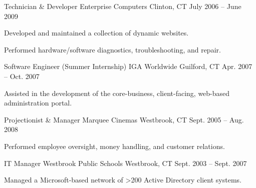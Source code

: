\begin{listSection}
    \listEntry
        {Technician \& Developer}
        {Enterprise Computers}
        {Clinton, CT}
        {July 2006 -- June 2009}
        {
            \begin{listGroupSection}
                \item {Developed and maintained a collection of dynamic websites.}
                \item {Performed hardware/software diagnostics, troubleshooting, and repair.}
            \end{listGroupSection}
        }

    \listEntry
        {Software Engineer (Summer Internship)}
        {IGA Worldwide}
        {Guilford, CT}
        {Apr. 2007 -- Oct. 2007}
        {
            \begin{listGroupSection}
                \item {Assisted in the development of the core-business, client-facing, web-based administration portal.}
            \end{listGroupSection}
        }

    \listEntry
        {Projectionist \& Manager}
        {Marquee Cinemas}
        {Westbrook, CT}
        {Sept. 2005 -- Aug. 2008}
        {
            \begin{listGroupSection}
                \item {Performed employee oversight, money handling, and customer relations.}
            \end{listGroupSection}
        }

    \listEntry
        {IT Manager}
        {Westbrook Public Schools}
        {Westbrook, CT}
        {Sept. 2003 -- Sept. 2007}
        {
            \begin{listGroupSection}
                \item {Managed a Microsoft-based network of >200 Active Directory client systems.}
            \end{listGroupSection}
        }

\end{listSection}

